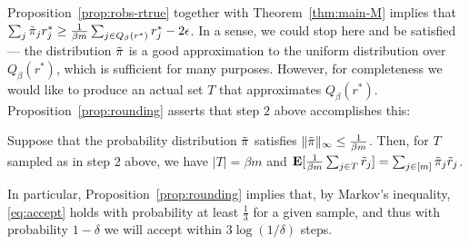

Proposition~\ref{prop:robs-rtrue} together with Theorem~\ref{thm:main-M} 
implies that $\sum_j \tilde{\pi}_j r^*_j \geq \frac{1}{\beta m} \sum_{j \in Q_{\beta}(r^*)} r^*_j - 2\epsilon$. In a sense, we could stop here and be satisfied --- 
the distribution $\tilde{\pi}$ is a good approximation to the uniform distribution 
over $Q_{\beta}(r^*)$, which is sufficient for many purposes. However, for 
completeness we would like to produce an actual set $T$ that approximates 
$Q_{\beta}(r^*)$. Proposition~\ref{prop:rounding} asserts that step $2$ above 
accomplishes this:

\begin{proposition}
\label{prop:rounding}
Suppose that the probability distribution $\tilde{\pi}$ satisfies 
$\|\tilde{\pi}\|_{\infty} \leq \frac{1}{\beta m}$. Then, for $T$ sampled 
as in step $2$ above, we have $|T| = \beta m$ and $\mathbf{E}[\frac{1}{\beta m}\sum_{j \in T} \tilde{r}_j] = \sum_{j \in [m]} \tilde{\pi}_j \tilde{r}_j$.
\end{proposition}
In particular, Proposition~\ref{prop:rounding} implies that, by 
Markov's inequality, \eqref{eq:accept} holds with probability at least 
$\frac{1}{3}$ for a given sample, and thus with probability 
$1-\delta$ we will accept within $3\log(1/\delta)$ steps.

